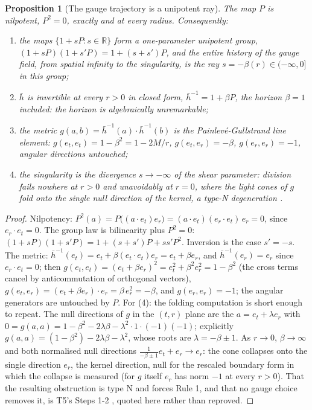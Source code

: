 \documentclass[11pt]{article}
\newtheorem{proposition}[theorem]{Proposition}
\theoremstyle{definition}
\newcommand{\R}{\mathbb{R}}
\newcommand{\hb}{\bar{h}}
\newcommand{\er}{e_r}
\newcommand{\et}{e_t}
\begin{document}
\begin{proposition}[The gauge trajectory is a unipotent ray]\label{prop:unipotent}
The map $P$ is nilpotent, $P^2 = 0$, exactly and at every radius. Consequently:
\begin{enumerate}
\item the maps $\{1 + sP : s \in \R\}$ form a one-parameter unipotent group, $(1 + sP)(1 + s'P) = 1 + (s + s')P$, and the entire history of the gauge field, from spatial infinity to the singularity, is the ray $s = -\beta(r) \in (-\infty, 0]$ in this group;
\item $\hb$ is invertible at every $r > 0$ in closed form, $\hb^{-1} = 1 + \beta P$, the horizon $\beta = 1$ included: the horizon is algebraically unremarkable;
\item the metric $g(a,b) = \hb^{-1}(a)\cdot\hb^{-1}(b)$ is the Painlev\'e-Gullstrand line element: $g(\et,\et) = 1 - \beta^2 = 1 - 2M/r$, $g(\et,\er) = -\beta$, $g(\er,\er) = -1$, angular directions untouched;
\item the singularity is the divergence $s \to -\infty$ of the shear parameter: division fails nowhere at $r > 0$ and unavoidably at $r = 0$, where the light cones of $g$ fold onto the single null direction of the kernel, a type-N degeneration \cite[Props.~2.4-2.6, 3.1]{ButlerT5}.
\end{enumerate}
\end{proposition}

\begin{proof}
Nilpotency: $P^2(a) = P\bigl((a\cdot\et)\er\bigr) = (a\cdot\et)(\er\cdot\et)\,\er = 0$, since $\er \cdot \et = 0$. The group law is bilinearity plus $P^2 = 0$: $(1 + sP)(1 + s'P) = 1 + (s + s')P + ss'P^2$. Inversion is the case $s' = -s$. The metric: $\hb^{-1}(\et) = \et + \beta(\et\cdot\et)\er = \et + \beta\er$, and $\hb^{-1}(\er) = \er$ since $\er \cdot \et = 0$; then $g(\et,\et) = (\et + \beta\er)^2 = \et^2 + \beta^2\er^2 = 1 - \beta^2$ (the cross terms cancel by anticommutation of orthogonal vectors), $g(\et,\er) = (\et + \beta\er)\cdot\er = \beta\,\er^2 = -\beta$, and $g(\er,\er) = -1$; the angular generators are untouched by $P$. For (4): the folding computation is short enough to repeat. The null directions of $g$ in the $(t,r)$ plane are the $a = \et + \lambda\er$ with $0 = g(a,a) = 1 - \beta^2 - 2\lambda\beta - \lambda^2 \cdot 1 \cdot (-1)(-1)$; explicitly $g(a,a) = (1-\beta^2) - 2\lambda\beta - \lambda^2$, whose roots are $\lambda = -\beta \pm 1$. As $r \to 0$, $\beta \to \infty$ and both normalised null directions $\tfrac{1}{-\beta\pm1}\et + \er \to \er$: the cone collapses onto the single direction $\er$, the kernel direction, null for the rescaled boundary form in which the collapse is measured \cite[Prop.~2.6]{ButlerT5} (for $g$ itself $\er$ has norm $-1$ at every $r > 0$). That the resulting obstruction is type N and forces Rule 1, and that no gauge choice removes it, is T5's Steps 1-2 \cite{ButlerT5}, quoted here rather than reproved.
\end{proof}
\end{document}
